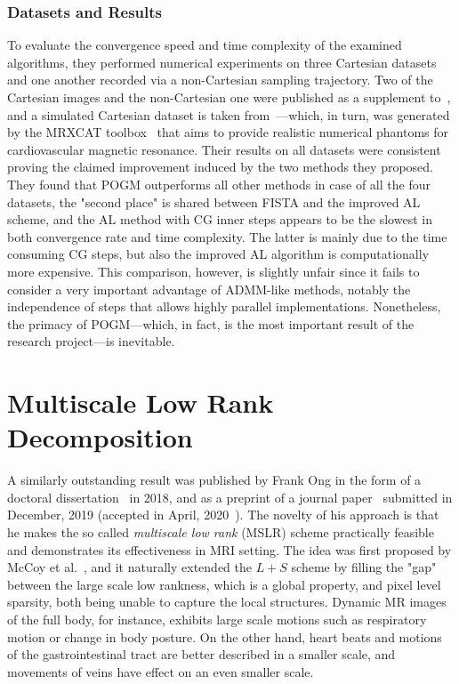 \subsubsection{Datasets and Results}
To evaluate the convergence speed and time complexity of the examined algorithms, they performed numerical experiments on three Cartesian datasets and one another recorded via a non-Cartesian sampling trajectory. Two of the Cartesian images and the non-Cartesian one were published as a supplement to~\cite{otazo_low-rank_2015}, and a simulated Cartesian dataset is taken from~\cite{nakarmi_accelerating_2016}---which, in turn, was generated by the MRXCAT toolbox~\cite{wissmann_mrxcat_2014} that aims to provide realistic numerical phantoms for cardiovascular magnetic resonance. Their results on all datasets were consistent proving the claimed improvement induced by the two methods they proposed. They found that POGM outperforms all other methods in case of all the four datasets, the "second place" is shared between FISTA and the improved AL scheme, and the AL method with CG inner steps appears to be the slowest in both convergence rate and time complexity. The latter is mainly due to the time consuming CG steps, but also the improved AL algorithm is computationally more expensive. This comparison, however, is slightly unfair since it fails to consider a very important advantage of ADMM-like methods, notably the independence of steps that allows highly parallel implementations. Nonetheless, the primacy of POGM---which, in fact, is the most important result of the research project---is inevitable.

\section{Multiscale Low Rank Decomposition}

A similarly outstanding result was published by Frank Ong in the form of a doctoral dissertation~\cite{ong_low_2018} in 2018, and as a preprint of a journal paper~\cite{ong_extreme_2020} submitted in December, 2019 (accepted in April, 2020~\cite{ong_extreme_2020-1}). The novelty of his approach is that he makes the so called \textit{multiscale low rank} (MSLR) scheme practically feasible and demonstrates its effectiveness in MRI setting. The idea was first proposed by McCoy et al.~\cite{mccoy_achievable_2013, mccoy_convexity_2014, mccoy_sharp_2014}, and it naturally extended the $L+S$ scheme by filling the "gap" between the large scale low rankness, which is a global property, and pixel level sparsity, both being unable to capture the local structures. Dynamic MR images of the full body, for instance, exhibits large scale motions such as respiratory motion or change in body posture. On the other hand, heart beats and motions of the gastrointestinal tract are better described in a smaller scale, and movements of veins have effect on an even smaller scale.

